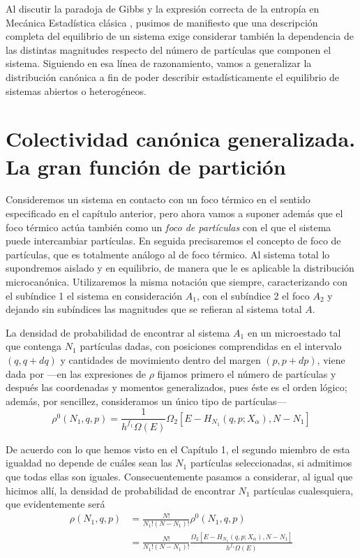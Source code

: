 Al discutir la paradoja de Gibbs y la expresión correcta de la entropía en Mecánica Estadística clásica , pusimos de manifiesto que una descripción completa del equilibrio de un sistema exige considerar también la dependencia de las distintas magnitudes respecto del número de partículas que componen el sistema.
Siguiendo en esa línea de razonamiento, vamos a generalizar la distribución canónica a fin de poder describir estadísticamente el equilibrio de sistemas abiertos o heterogéneos.

\newpage
\section{Colectividad canónica generalizada. La gran función de partición}

Consideremos un sistema en contacto con un foco térmico en el sentido especificado en el capítulo anterior, pero ahora vamos a suponer además que el foco térmico actúa también como un \emph{foco de partículas} con el que el sistema puede intercambiar partículas.
En seguida precisaremos el concepto de foco de partículas, que es totalmente análogo al de foco térmico. 
Al sistema total  lo supondremos aislado y en equilibrio, de manera que le es aplicable la distribución microcanónica.
Utilizaremos la misma notación que siempre, caracterizando con el subíndice 1 el sistema en consideración $A_1$,
con el subíndice 2 el foco $A_2$ y dejando sin subíndices las magnitudes que se refieran al sistema total $A$.

La densidad de probabilidad de encontrar al sistema $A_1$ en un microestado tal que contenga $N_1$ partículas dadas, con posiciones comprendidas en el intervalo $(q, q + dq)$ y cantidades de movimiento dentro del margen $(p, p+dp)$, viene dada por ---en las expresiones de $\rho$ fijamos primero el número de partículas y después las coordenadas y momentos generalizados, pues éste es el orden lógico; además, por sencillez, consideramos un único tipo de partículas---
\begin{equation}
	\rho^0(N_1,q,p) = \frac{1}{h^{f_1} \Omega(E)} \Omega_2 \left[ E - H_{N_1}(q,p;X_\alpha), N-N_1 \right]
\end{equation}

De acuerdo con lo que hemos visto en el Capítulo 1, el segundo miembro de esta igualdad no depende de cuáles sean las $N_1$ partículas seleccionadas, si admitimos que todas ellas son iguales.
Consecuentemente pasamos a considerar, al igual que hicimos allí, la densidad de probabilidad de encontrar $N_1$ partículas cualesquiera, que evidentemente será
\begin{align}
	\rho(N_1,q,p) &= \frac{N!}{N_1!(N-N_1)!}\rho^0(N_1,q,p) \nonumber \\ 
				  &= \frac{N!}{N_1!(N-N_1)!} \frac{\Omega_2 \left[ E - H_{N_1}(q,p;X_\alpha), N-N_1 \right]}{h^{f_1} \Omega(E)}
\end{align}

